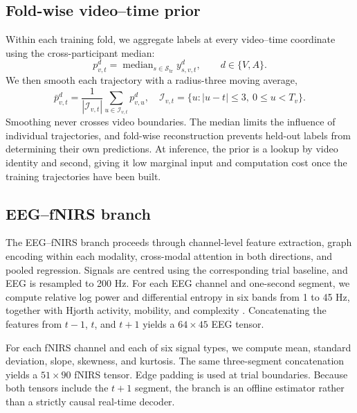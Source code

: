 \subsection{Fold-wise video--time prior}

Within each training fold, we aggregate labels at every video--time coordinate
using the cross-participant median:
\begin{equation}
 p^d_{v,t} =
 \operatorname{median}_{s\in\mathcal S_{\mathrm{tr}}} y^d_{s,v,t},
 \qquad d\in\{V,A\}.
\end{equation}
We then smooth each trajectory with a radius-three moving average,
\begin{equation}
 \bar p^d_{v,t} =
 \frac{1}{|\mathcal I_{v,t}|}
 \sum_{u\in\mathcal I_{v,t}} p^d_{v,u},
 \quad
 \mathcal I_{v,t}=\{u:|u-t|\leq3,\ 0\leq u<T_v\}.
\end{equation}
Smoothing never crosses video boundaries. The median limits the influence of
individual trajectories, and fold-wise reconstruction prevents held-out labels
from determining their own predictions. At inference, the prior is a lookup by
video identity and second, giving it low marginal input and computation cost
once the training trajectories have been built.

\subsection{EEG--fNIRS branch}

The EEG--fNIRS branch proceeds through channel-level feature extraction, graph
encoding within each modality, cross-modal attention in both directions, and
pooled regression. Signals are centred using the corresponding trial baseline, and
EEG is resampled to 200 Hz. For each EEG channel and one-second segment, we
compute relative log power and differential entropy in six bands from 1 to
45 Hz, together with Hjorth activity, mobility, and complexity
\cite{hjorth1970eeg}. Concatenating the features from \(t-1\), \(t\), and
\(t+1\) yields a \(64\times45\) EEG tensor.

For each fNIRS channel and each of six signal types, we compute mean, standard
deviation, slope, skewness, and kurtosis. The same three-segment concatenation
yields a \(51\times90\) fNIRS tensor. Edge padding is used at trial boundaries.
Because both tensors include the \(t+1\) segment, the branch is an offline
estimator rather than a strictly causal real-time decoder.

